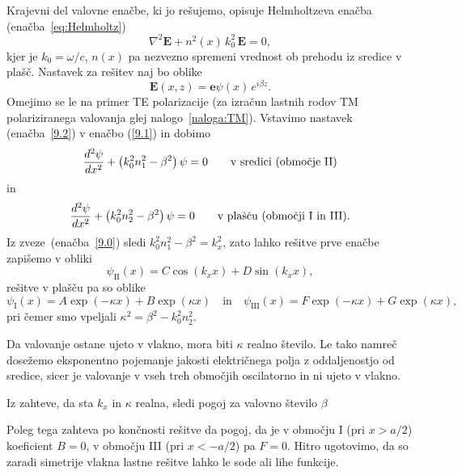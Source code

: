 Krajevni del valovne enačbe, ki jo rešujemo, opisuje Helmholtzeva 
enačba (enačba~\ref{eq:Helmholtz})
\begin{equation}
\nabla^{2}\mathbf{E}+n^2(x)\,k_{0}^{2}\,\mathbf{E}=0,
\label{9.1}
\end{equation}
kjer je $k_{0}=\omega/c$, $n(x)$ pa nezvezno spremeni vrednost ob prehodu iz sredice v plašč. 
Nastavek za rešitev naj bo oblike 
\begin{equation}
{\mathbf E}(x,z)=\mathbf{e}\psi\left(x\right)\, e^{i\beta z}.
\label{9.2}
\end{equation}
Omejimo se le na primer TE polarizacije (za izračun lastnih rodov 
TM polariziranega
valovanja glej nalogo~\ref{naloga:TM}). Vstavimo nastavek (enačba~\ref{9.2}) v enačbo
(\ref{9.1}) in dobimo
\begin{equation}
\frac{d^{2}{\bf \psi}}{dx^{2}}+\left(k_{0}^{2}n_1^{2}-\beta^{2}\right){\bf \psi}=0
\qquad \textrm{v sredici (obmo\v cje II)} 
\label{9.3a}
\end{equation}
in 
\begin{equation}
\frac{d^{2}{\bf \psi}}{dx^{2}}+\left(k_{0}^{2}n_2^{2}-\beta^{2}\right){\bf \psi}=0
\qquad \textrm{v plašču (obmo\v cji I in III).} 
\label{9.3b}
\end{equation}
Iz zveze~(enačba~\ref{9.0}) sledi $k_0^2n_1^2-\beta^2=k_x^2$, zato lahko rešitve prve enačbe
zapišemo v obliki
\begin{equation}
\psi_{\mathrm{II}}(x) = C \cos(k_x x)+D \sin(k_x x),
\end{equation}
rešitve v plašču pa so oblike
\begin{equation}
\psi_{\mathrm{I}}(x) = A \exp(-\kappa x)+B \exp(\kappa x)\quad \mathrm{in}\quad
\psi_{\mathrm{III}}(x) = F \exp(-\kappa x)+G \exp(\kappa x),
\end{equation}
pri čemer smo vpeljali $\kappa^2= \beta^2-k_0^2n_2^2$.

Da valovanje ostane ujeto v vlakno, mora biti $\kappa$ realno število.
Le tako namreč dosežemo eksponentno pojemanje jakosti električnega polja 
z oddaljenostjo od sredice,
sicer je valovanje v vseh treh območjih oscilatorno in ni ujeto v vlakno. 

Iz zahteve, da sta $k_x$ in $\kappa$ realna, sledi pogoj za valovno 
število $\beta$

Poleg tega zahteva po končnosti rešitve da pogoj, da je v območju I 
(pri $x>a/2$) koeficient $B=0$, 
v območju III (pri $x<-a/2$) pa $F=0$. Hitro ugotovimo, da so zaradi 
simetrije vlakna lastne rešitve lahko le sode ali lihe funkcije. 

